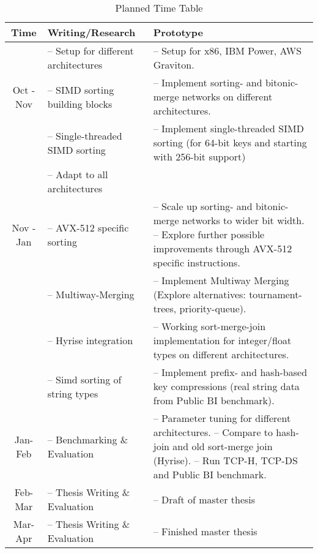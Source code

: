 \begin{longtable}{ | c | m{} | m{} | }
   \caption{Planned Time Table} \label{tab:time-table} \\
    \hline
    \textbf{Time} & \textbf{Writing/Research} & \textbf{Prototype} \\
    \hline
               & -- Setup for different architectures &  -- Setup for x86, IBM Power, AWS Graviton. \\
    Oct - Nov  & -- SIMD sorting building blocks & -- Implement sorting- and bitonic-merge networks on different architectures.\\ 
               & -- Single-threaded SIMD sorting & -- Implement single-threaded SIMD sorting (for 64-bit keys and starting with 256-bit support) \\ 
               & -- Adapt to all architectures \\
    \hline
    Nov - Jan & -- AVX-512 specific sorting & -- Scale up sorting- and bitonic-merge networks to wider bit width. \newline -- Explore further possible improvements through AVX-512 specific instructions. \\
              & -- Multiway-Merging & -- Implement Multiway Merging (Explore alternatives: tournament-trees, priority-queue). \\    
              & -- Hyrise integration & -- Working sort-merge-join implementation for integer/float types on different architectures.\\ 
              & -- Simd sorting of string types & -- Implement prefix- and hash-based key compressions (real string data from Public BI benchmark).\\ 
    \hline
    Jan-Feb & -- Benchmarking \& Evaluation & -- Parameter tuning for different architectures. \newline 
                                               -- Compare to hash-join and old sort-merge join (Hyrise). \newline
                                               -- Run TCP-H, TCP-DS and Public BI benchmark. \\
    \hline
    Feb-Mar & -- Thesis Writing \& Evaluation & -- Draft of master thesis\\
    \hline
    Mar-Apr & -- Thesis Writing \& Evaluation & -- Finished master thesis \\
   \hline 
\end{longtable}


